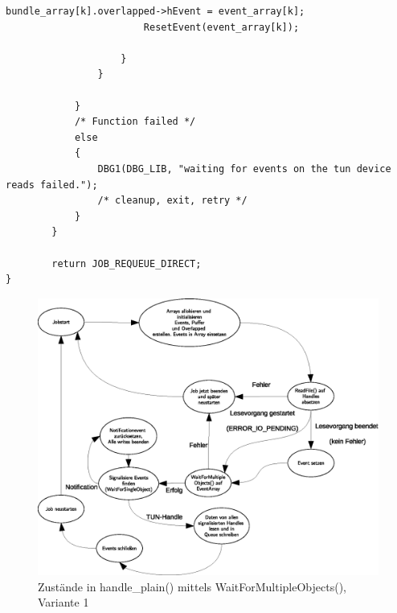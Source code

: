 \begin{lstlisting}[caption=Code für handle\_plain auf Windows]
                        bundle_array[k].overlapped->hEvent = event_array[k];
                        ResetEvent(event_array[k]);

                    }
                }

            }
            /* Function failed */
            else
            {
                DBG1(DBG_LIB, "waiting for events on the tun device reads failed.");
                /* cleanup, exit, retry */
            }
        }

        return JOB_REQUEUE_DIRECT;
}
\end{lstlisting}

\begin{figure}
\label{fig:WaitForMultipleObjects}
\centering
\def\svgwidth{\columnwidth}
\includegraphics[width=\textwidth]{WaitForMultipleObjects.eps}
\caption{Zustände in handle\_plain() mittels WaitForMultipleObjects(), Variante 1}
\end{figure}

